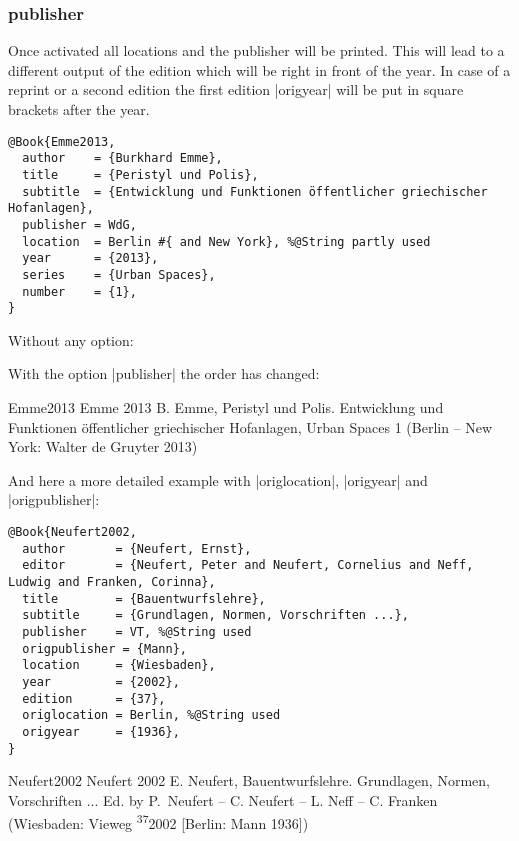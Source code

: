 \documentclass[a4paper,
10pt,
greek,
french,
spanish,
italian,
ngerman,
english
]{ltxdoc}
\begin{document}
\subsubsection{publisher}\label{publisher}
Once activated all locations and the publisher will be printed. This will lead to a different output of the edition which will be right in front of the year.
In case of a reprint or a second edition the first edition |origyear| will be put in square brackets after the year.

\begin{lstlisting}[style=bibentry,label=Emme2013,caption={{@}Book\{Emme2013,…\} }]
@Book{Emme2013,
  author    = {Burkhard Emme},
  title     = {Peristyl und Polis},
  subtitle  = {Entwicklung und Funktionen öffentlicher griechischer Hofanlagen},
  publisher = WdG,
  location  = Berlin #{ and New York}, %@String partly used
  year      = {2013},
  series    = {Urban Spaces},
  number    = {1},
}
\end{lstlisting}

\begin{refsection}\end{refsection}%
Without any option:

 
With the option |publisher| the order has changed:
 \begin{bibbsp}{Emme2013}
Emme 2013\hspace{3em} B. Emme, Peristyl und Polis. Entwicklung und Funktionen öffentlicher griechischer Hofanlagen, Urban Spaces 1 (Berlin {\color{red} – New York: Walter de Gruyter} 2013)
 \end{bibbsp}
 
 And here a more detailed example with |origlocation|, |origyear| and |origpublisher|:
 \begin{lstlisting}[style=bibentry,label=Neufert2002,caption={{@}Book\{Neufert2002,…\} }]
 @Book{Neufert2002,
  author       = {Neufert, Ernst},
  editor       = {Neufert, Peter and Neufert, Cornelius and Neff, Ludwig and Franken, Corinna},
  title        = {Bauentwurfslehre},
  subtitle     = {Grundlagen, Normen, Vorschriften ...},
  publisher    = VT, %@String used
  origpublisher = {Mann},
  location     = {Wiesbaden},
  year         = {2002},
  edition      = {37},
  origlocation = Berlin, %@String used
  origyear     = {1936},
}
\end{lstlisting}
  \begin{bibbsp}{Neufert2002}
Neufert  2002\hspace{3em} E. Neufert, Bauentwurfslehre. Grundlagen, Normen, Vorschriften ... Ed. by P.~Neufert – C. Neufert – L. Neff  – C. Franken {\color{red}  (Wiesbaden: Vieweg \textsuperscript{37}2002 [Berlin: Mann 1936])}
 \end{bibbsp}
 
\end{document}
